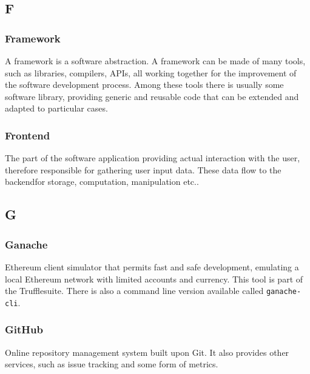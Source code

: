 

\subsection*{F}

\subsubsection*{Framework}
A framework is a software abstraction. A framework can be made of many tools, such as libraries, compilers, APIs\glo, all working together for the improvement of the software development process. Among these tools there is usually some software library, providing generic and reusable code that can be extended and adapted to particular cases.

\subsubsection*{Frontend}
The part of the software application providing actual interaction with the user, therefore responsible for gathering user input data. These data flow to the backend\glosp for storage, computation, manipulation etc..


\subsection*{G}

\subsubsection*{Ganache}
Ethereum client simulator that permits fast and safe development, emulating a local Ethereum network with limited accounts and currency. This tool is part of the Truffle\glosp suite. There is also a command line version available called \texttt{ganache-cli}.

\subsubsection*{GitHub}
Online repository management system built upon Git. It also provides other services, such as issue tracking and some form of metrics.

